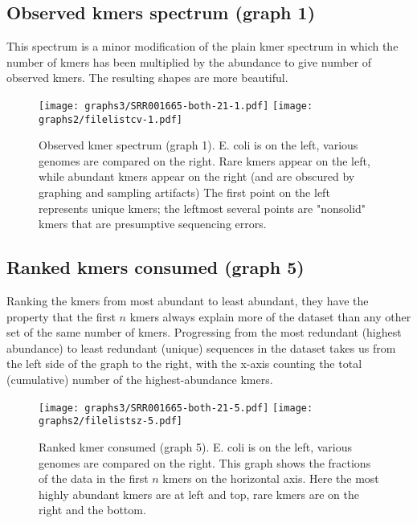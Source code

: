 \documentclass[11pt,fullpage]{article}
\begin{document}
\subsection{Observed kmers spectrum (graph 1) }

This spectrum is a minor modification of the plain kmer spectrum in which the number
of kmers has been multiplied by the abundance to give number of observed kmers.
The resulting shapes are more beautiful.

\begin{figure}
\begin{center}
\texttt{[image: graphs3/SRR001665-both-21-1.pdf]} \texttt{[image: graphs2/filelistcv-1.pdf]}
\end{center}
\caption{Observed kmer spectrum (graph 1).  E. coli is on the left, various genomes are compared on the right.
Rare kmers appear on the left, while abundant kmers appear on the right (and are obscured by graphing and sampling artifacts)
The first point on the left represents unique kmers; the leftmost several points are "nonsolid" kmers
that are presumptive sequencing errors. }
\label{graph1}
\end{figure}

\subsection{Ranked kmers consumed (graph 5) }

Ranking the kmers from most abundant to least abundant, they have the property that the
first $n$ kmers always explain more of the dataset than any other set of the same number
of kmers.  Progressing from the most redundant (highest abundance) to least redundant
(unique) sequences in the dataset takes us from the left side of the graph to the right,
with the x-axis counting the total (cumulative) number of the highest-abundance kmers.

\begin{figure}
\begin{center}
\texttt{[image: graphs3/SRR001665-both-21-5.pdf]} \texttt{[image: graphs2/filelistsz-5.pdf]}
\end{center}
\caption{Ranked kmer consumed (graph 5).  E. coli is on the left, various genomes are compared on the right. This
graph shows the fractions of the data in the first $n$ kmers on the horizontal axis.  Here the most highly abundant
kmers are at left and top, rare kmers are on the right and the bottom.}
\label{graph5}
\end{figure}
	
\end{document}
